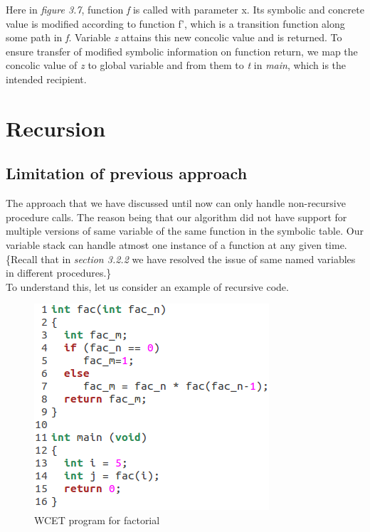 \documentclass[12pt,oneside]{book}
\begin{document}
Here in \textit{figure 3.7}, function \textit{f} is called with parameter x. Its symbolic and concrete value is modified according to function f', which is a transition function along some path in \textit{f}. Variable \textit{z} attains this new concolic value and is returned. To ensure transfer of modified symbolic information on function return, we map the concolic value of \textit{z} to global variable and from them to \textit{t} in \textit{main}, which is the intended recipient.

\newpage

\section{Recursion}
\subsection{Limitation of previous approach}
The approach that we have discussed until now can only handle non-recursive procedure calls. The reason being that our algorithm did not have support for multiple versions of same variable of the same function in the symbolic table. Our variable stack can handle atmost one instance of a function at any given time.
\{Recall that in \textit{section 3.2.2} we have resolved the issue of same named variables in different procedures.\}\\
To understand this, let us consider an example of recursive code.

\vspace{0.4cm}
\begin{figure}[htbp]
\centering
\includegraphics[scale=0.60]{fac.png}
\caption{WCET program for factorial}
\end{figure}
\end{document}
